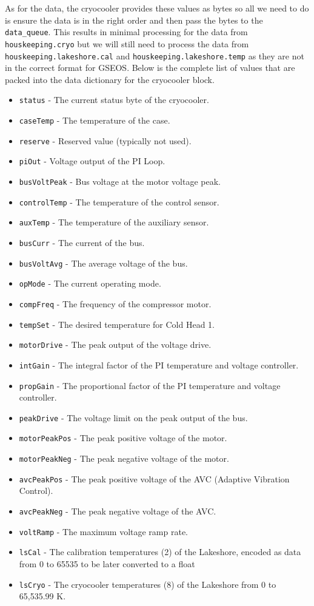 As for the data, the cryocooler provides these values as bytes so all we need to do is ensure the data is in the right order and then pass the bytes to the \texttt{data\_queue}. 
This results in minimal processing for the data from \texttt{houskeeping.cryo} but we will still need to process the data from \texttt{houskeeping.lakeshore.cal} and \texttt{houskeeping.lakeshore.temp} as they are not in the correct format for GSEOS.
Below is the complete list of values that are packed into the data dictionary for the cryocooler block.
\begin{itemize}
    \item \texttt{status} - The current status byte of the cryocooler.
    \item \texttt{caseTemp} - The temperature of the case.
    \item \texttt{reserve} - Reserved value (typically not used).
    \item \texttt{piOut} - Voltage output of the PI Loop.
    \item \texttt{busVoltPeak} - Bus voltage at the motor voltage peak.
    \item \texttt{controlTemp} - The temperature of the control sensor.
    \item \texttt{auxTemp} - The temperature of the auxiliary sensor.
    \item \texttt{busCurr} - The current of the bus.
    \item \texttt{busVoltAvg} - The average voltage of the bus.
    \item \texttt{opMode} - The current operating mode.
    \item \texttt{compFreq} - The frequency of the compressor motor.
    \item \texttt{tempSet} - The desired temperature for Cold Head 1.
    \item \texttt{motorDrive} - The peak output of the voltage drive.
    \item \texttt{intGain} - The integral factor of the PI temperature and voltage controller.
    \item \texttt{propGain} - The proportional factor of the PI temperature and voltage controller.
    \item \texttt{peakDrive} - The voltage limit on the peak output of the bus.
    \item \texttt{motorPeakPos} - The peak positive voltage of the motor.
    \item \texttt{motorPeakNeg} - The peak negative voltage of the motor.
    \item \texttt{avcPeakPos} - The peak positive voltage of the AVC (Adaptive Vibration Control).
    \item \texttt{avcPeakNeg} - The peak negative voltage of the AVC.
    \item \texttt{voltRamp} - The maximum voltage ramp rate.
    \item \texttt{lsCal} - The calibration temperatures (2) of the Lakeshore, encoded as data from 0 to 65535 to be later converted to a float
    \item \texttt{lsCryo} - The cryocooler temperatures (8) of the Lakeshore from 0 to 65,535.99 K. 
\end{itemize}


